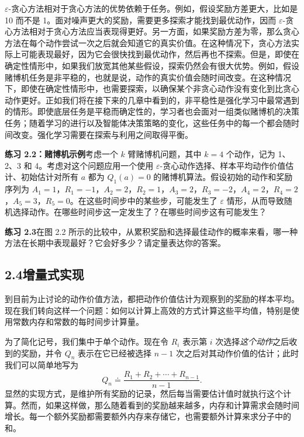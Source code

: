 \documentclass[UTF8, 12pt, fontset=fandol, oneside]{ctexart}
\begin{document}
$\varepsilon$-贪心方法相对于贪心方法的优势依赖于任务。例如，假设奖励方差更大，比如是 10 而不是 1。面对噪声更大的奖励，需要更多探索才能找到最优动作，因而 $\varepsilon$-贪心方法相对于贪心方法应当表现得更好。另一方面，如果奖励方差为零，那么贪心方法在每个动作尝试一次之后就会知道它的真实价值。在这种情况下，贪心方法实际上可能表现最好，因为它会很快找到最优动作，然后再也不探索。但是，即使在确定性情形中，如果我们放宽其他某些假设，探索仍然会有很大优势。例如，假设赌博机任务是非平稳的，也就是说，动作的真实价值会随时间改变。在这种情况下，即使在确定性情形中，也需要探索，以确保某个非贪心动作没有变化到比贪心动作更好。正如我们将在接下来的几章中看到的，非平稳性是强化学习中最常遇到的情形。即使底层任务是平稳而确定性的，学习者也会面对一组类似赌博机的决策任务；随着学习的进行以及智能体决策策略的变化，这些任务中的每一个都会随时间改变。强化学习需要在探索与利用之间取得平衡。

\noindent\textbf{练习 2.2：赌博机示例}\quad 考虑一个 $k$ 臂赌博机问题，其中 $k=4$ 个动作，记为 1、2、3 和 4。考虑对这个问题应用一个使用 $\varepsilon$-贪心动作选择、样本平均动作价值估计、初始估计对所有 $a$ 都为 $Q_1(a)=0$ 的赌博机算法。假设初始的动作和奖励序列为 $A_1=1$，$R_1=-1$，$A_2=2$，$R_2=1$，$A_3=2$，$R_3=-2$，$A_4=2$，$R_4=2$，$A_5=3$，$R_5=0$。在这些时间步中的某些步，可能发生了 $\varepsilon$ 情形，从而导致随机选择动作。在哪些时间步这一定发生了？在哪些时间步这有可能发生？

\noindent\textbf{练习 2.3}\quad 在图 2.2 所示的比较中，从累积奖励和选择最佳动作的概率来看，哪一种方法在长期中表现最好？它会好多少？请定量表达你的答案。

\subsection*{2.4\quad 增量式实现}

到目前为止讨论的动作价值方法，都把动作价值估计为观察到的奖励的样本平均。现在我们转向这样一个问题：如何以计算上高效的方式计算这些平均值，特别是使用常数内存和常数的每时间步计算量。

为了简化记号，我们集中于单个动作。现在令 $R_i$ 表示第 $i$ 次选择\emph{这个动作}之后收到的奖励，并令 $Q_n$ 表示在它已经被选择 $n-1$ 次之后对其动作价值的估计；此时我们可以简单地写为
\[
Q_n\doteq \frac{R_1+R_2+\cdots+R_{n-1}}{n-1}.
\]
显然的实现方式，是维护所有奖励的记录，然后每当需要估计值时就执行这个计算。然而，如果这样做，那么随着看到的奖励越来越多，内存和计算需求会随时间增长。每一个额外奖励都需要额外内存来存储它，也需要额外计算来求分子中的和。
\end{document}

